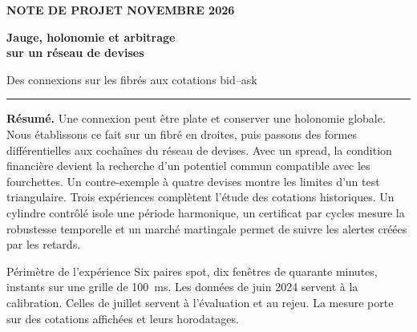 \documentclass[11pt,a4paper]{article}
\theoremstyle{clair}
\begin{document}
\thispagestyle{plain}
{\sffamily\bfseries\small\color{teal} NOTE DE PROJET \hfill NOVEMBRE 2026}

\vspace{12mm}
{\sffamily\bfseries\color{ink}\fontsize{34}{37}\selectfont
 Jauge, holonomie et arbitrage\\[1mm] sur un réseau de devises\par}
\vspace{3mm}
{\sffamily\Large\color{muted} Des connexions sur les fibrés aux cotations bid--ask\par}
\vspace{6mm}
\textcolor{rulecolor}{\rule{\textwidth}{0.7pt}}

\vspace{3mm}
\begin{minipage}[c]{0.61\textwidth}
\textbf{Résumé.} Une connexion peut être plate et conserver une holonomie globale. Nous établissons ce fait sur un fibré en droites, puis passons des formes différentielles aux cochaînes du réseau de devises. Avec un spread, la condition financière devient la recherche d'un potentiel commun compatible avec les fourchettes. Un contre-exemple à quatre devises montre les limites d'un test triangulaire. Trois expériences complètent l'étude des cotations historiques. Un cylindre contrôlé isole une période harmonique, un certificat par cycles mesure la robustesse temporelle et un marché martingale permet de suivre les alertes créées par les retards.
\end{minipage}\hfill
\begin{minipage}[c]{0.34\textwidth}
\centering
{}
\end{minipage}

\vspace{4mm}
\begin{callout}{Périmètre de l'expérience}
Six paires spot, dix fenêtres de quarante minutes, \TotalGrille{} instants sur une grille de 100~ms. Les données de juin 2024 servent à la calibration. Celles de juillet servent à l'évaluation et au rejeu. La mesure porte sur des cotations affichées et leurs horodatages.
\end{callout}
\vspace{2mm}
\end{document}
